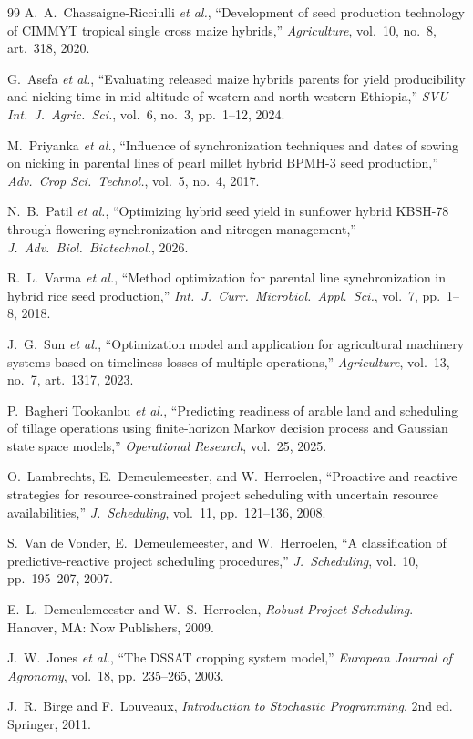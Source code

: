 \documentclass[10pt,twocolumn]{article}
\begin{document}
\begin{thebibliography}{99}
A.~A.~Chassaigne-Ricciulli \textit{et al.},
``Development of seed production technology of CIMMYT tropical single cross
maize hybrids,'' \textit{Agriculture}, vol.~10, no.~8, art.~318, 2020.

G.~Asefa \textit{et al.},
``Evaluating released maize hybrids parents for yield producibility and
nicking time in mid altitude of western and north western Ethiopia,''
\textit{SVU-Int.\ J.\ Agric.\ Sci.}, vol.~6, no.~3, pp.~1--12, 2024.

M.~Priyanka \textit{et al.},
``Influence of synchronization techniques and dates of sowing on nicking in
parental lines of pearl millet hybrid BPMH-3 seed production,''
\textit{Adv.\ Crop Sci.\ Technol.}, vol.~5, no.~4, 2017.

N.~B.~Patil \textit{et al.},
``Optimizing hybrid seed yield in sunflower hybrid KBSH-78 through flowering
synchronization and nitrogen management,'' \textit{J.\ Adv.\ Biol.\
Biotechnol.}, 2026.

R.~L.~Varma \textit{et al.},
``Method optimization for parental line synchronization in hybrid rice seed
production,'' \textit{Int.\ J.\ Curr.\ Microbiol.\ Appl.\ Sci.}, vol.~7,
pp.~1--8, 2018.

J.~G.~Sun \textit{et al.},
``Optimization model and application for agricultural machinery systems based
on timeliness losses of multiple operations,'' \textit{Agriculture},
vol.~13, no.~7, art.~1317, 2023.

P.~Bagheri Tookanlou \textit{et al.},
``Predicting readiness of arable land and scheduling of tillage operations
using finite-horizon Markov decision process and Gaussian state space
models,'' \textit{Operational Research}, vol.~25, 2025.

O.~Lambrechts, E.~Demeulemeester, and W.~Herroelen,
``Proactive and reactive strategies for resource-constrained project
scheduling with uncertain resource availabilities,'' \textit{J.\ Scheduling},
vol.~11, pp.~121--136, 2008.

S.~Van de Vonder, E.~Demeulemeester, and W.~Herroelen,
``A classification of predictive-reactive project scheduling procedures,''
\textit{J.\ Scheduling}, vol.~10, pp.~195--207, 2007.

E.~L.~Demeulemeester and W.~S.~Herroelen,
\textit{Robust Project Scheduling}. Hanover, MA: Now Publishers, 2009.

J.~W.~Jones \textit{et al.},
``The DSSAT cropping system model,'' \textit{European Journal of Agronomy},
vol.~18, pp.~235--265, 2003.

J.~R.~Birge and F.~Louveaux,
\textit{Introduction to Stochastic Programming}, 2nd ed. Springer, 2011.

\end{thebibliography}
\end{document}
